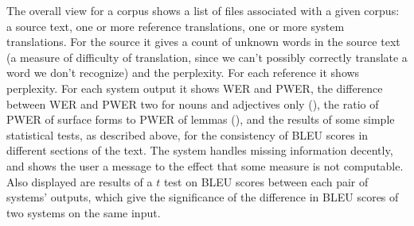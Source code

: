 \documentclass[10pt]{report}
\theoremstyle{plain}
\begin{document}
{The overall view for a corpus shows a list of files associated with a given corpus: a source text, one or more reference translations, one or more system translations. For the source it gives a count of unknown words in the source text (a measure of difficulty of translation, since we can't possibly correctly translate a word we don't recognize) and the perplexity. For each reference it shows perplexity. For each system output it shows WER and PWER, the difference between WER and PWER two for nouns and adjectives only (\cite{errMeasures}), the ratio of PWER of surface forms to PWER of lemmas (\cite{errMeasures}), and the results of some simple statistical tests, as described above, for the consistency of BLEU scores in different sections of the text. The system handles missing information decently, and shows the user a message to the effect that some measure is not computable. Also displayed are results of a $t$ test on BLEU scores between each pair of systems' outputs, which give the significance of the difference in BLEU scores of two systems on the same input.

}
\end{document}
